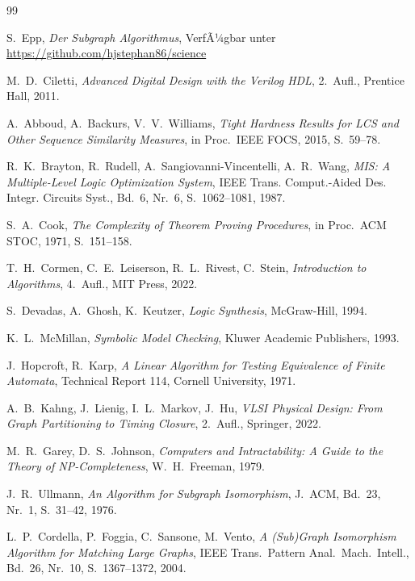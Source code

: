 ﻿\documentclass[a4paper,12pt]{article}
\theoremstyle{definition}
\begin{document}
\begin{thebibliography}{99}

S.~Epp,
\emph{Der Subgraph Algorithmus},
VerfÃ¼gbar unter \url{https://github.com/hjstephan86/science}

M.~D.~Ciletti,
\emph{Advanced Digital Design with the Verilog HDL},
2.~Aufl., Prentice Hall, 2011.

A.~Abboud, A.~Backurs, V.~V.~Williams,
\emph{Tight Hardness Results for LCS and Other Sequence Similarity Measures},
in Proc.~IEEE FOCS, 2015, S.~59--78.

R.~K.~Brayton, R.~Rudell, A.~Sangiovanni-Vincentelli, A.~R.~Wang,
\emph{MIS: A Multiple-Level Logic Optimization System},
IEEE Trans. Comput.-Aided Des. Integr. Circuits Syst., Bd.~6, Nr.~6, S.~1062--1081, 1987.

S.~A.~Cook,
\emph{The Complexity of Theorem Proving Procedures},
in Proc.~ACM STOC, 1971, S.~151--158.

T.~H.~Cormen, C.~E.~Leiserson, R.~L.~Rivest, C.~Stein,
\emph{Introduction to Algorithms},
4.~Aufl., MIT Press, 2022.

S.~Devadas, A.~Ghosh, K.~Keutzer,
\emph{Logic Synthesis},
McGraw-Hill, 1994.

K.~L.~McMillan,
\emph{Symbolic Model Checking},
Kluwer Academic Publishers, 1993.

J.~Hopcroft, R.~Karp,
\emph{A Linear Algorithm for Testing Equivalence of Finite Automata},
Technical Report 114, Cornell University, 1971.

A.~B.~Kahng, J.~Lienig, I.~L.~Markov, J.~Hu,
\emph{VLSI Physical Design: From Graph Partitioning to Timing Closure},
2.~Aufl., Springer, 2022.


M.~R.~Garey, D.~S.~Johnson,
\emph{Computers and Intractability: A Guide to the Theory of NP-Completeness},
W.~H.~Freeman, 1979.

J.~R.~Ullmann,
\emph{An Algorithm for Subgraph Isomorphism},
J.~ACM, Bd.~23, Nr.~1, S.~31--42, 1976.

L.~P.~Cordella, P.~Foggia, C.~Sansone, M.~Vento,
\emph{A (Sub)Graph Isomorphism Algorithm for Matching Large Graphs},
IEEE Trans.~Pattern Anal.~Mach.~Intell., Bd.~26, Nr.~10, S.~1367--1372, 2004.


\end{thebibliography}
\end{document}
